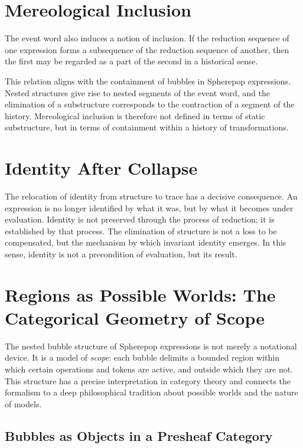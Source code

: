 \documentclass[12pt, oneside]{amsbook}
\theoremstyle{plain}
\theoremstyle{definition}
\theoremstyle{remark}
\begin{document}
\section{Mereological Inclusion}
\label{sec:identity:mereology}

The event word also induces a notion of inclusion. If the reduction sequence of
one expression forms a subsequence of the reduction sequence of another, then
the first may be regarded as a part of the second in a historical sense.

This relation aligns with the containment of bubbles in Spherepop expressions.
Nested structures give rise to nested segments of the event word, and the
elimination of a substructure corresponds to the contraction of a segment of
the history. Mereological inclusion is therefore not defined in terms of static
substructure, but in terms of containment within a history of transformations.

\section{Identity After Collapse}
\label{sec:identity:conclusion}

The relocation of identity from structure to trace has a decisive consequence.
An expression is no longer identified by what it was, but by what it becomes
under evaluation. Identity is not preserved through the process of reduction;
it is established by that process. The elimination of structure is not a loss
to be compensated, but the mechanism by which invariant identity emerges. In
this sense, identity is not a precondition of evaluation, but its result.

\section{Regions as Possible Worlds: The Categorical Geometry of Scope}
\label{sec:identity:worlds}

The nested bubble structure of Spherepop expressions is not merely a notational
device. It is a model of \emph{scope}: each bubble delimits a bounded region
within which certain operations and tokens are active, and outside which they
are not. This structure has a precise interpretation in category theory and
connects the formalism to a deep philosophical tradition about possible worlds
and the nature of models.

\subsection{Bubbles as Objects in a Presheaf Category}
\end{document}
